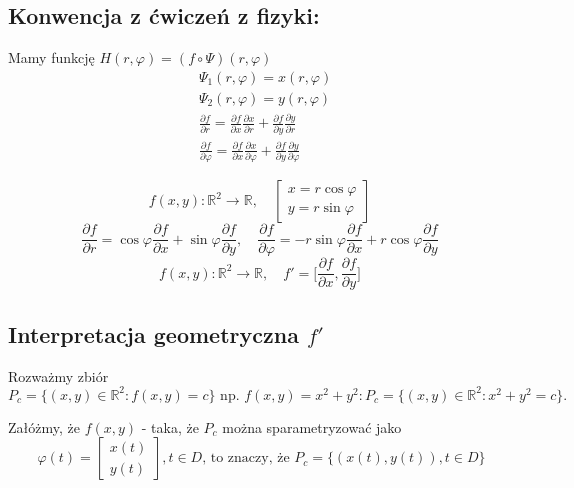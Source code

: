 \documentclass[../main.tex]{subfiles}
\begin{document}
\subsection{Konwencja z ćwiczeń z fizyki:}
\begin{przyklad}
Mamy funkcję $H(r,\varphi) = (f \circ \Psi)(r,\varphi)$
\begin{align*}
    &\Psi_1(r,\varphi)=x(r,\varphi)\\
    &\Psi_2(r,\varphi)=y(r,\varphi)\\
    &\frac{\partial f}{\partial r} = \frac{\partial f}{\partial x} \frac{\partial x}{\partial r} + \frac{\partial f}{\partial y} \frac{\partial y}{\partial r}\\
    &\frac{\partial f}{\partial \varphi} = \frac{\partial f}{\partial x} \frac{\partial x}{\partial \varphi} + \frac{\partial f}{\partial y} \frac{\partial y}{\partial \varphi}
\end{align*}

\end{przyklad}

\begin{przyklad}

\end{przyklad}
$$f(x,y):\mathbb{R}^2 \to \mathbb{R},\quad
\left [ \begin{matrix}
x=r\cos{\varphi}\\
y=r\sin{\varphi}\end{matrix}\right ]$$
$$\frac{\partial f}{\partial r} = \cos{\varphi} \frac{\partial f}{\partial x} + \sin{\varphi} \frac{\partial f}{\partial y},\quad
\frac{\partial f}{\partial \varphi} = -r\sin{\varphi} \frac{\partial f}{\partial x} + r\cos{\varphi} \frac{\partial f}{\partial y}$$
$$f(x,y):\mathbb{R}^2 \to \mathbb{R},\quad
f'= \Big [ \frac{\partial f}{\partial x} , \frac{\partial f}{\partial y} \Big ]$$

\subsection{Interpretacja geometryczna $f'$}
\begin{przyklad}

Rozważmy zbiór
    \[
        P_c = \{(x,y)\in \mathbb{R}^2 : f(x,y) = c \} \text{ np. } f(x,y) = x^2 + y^2 : P_c = \{(x,y)\in\mathbb{R}^2 : x^2+y^2 = c \}.
    \]

Załóżmy, że $f(x,y)$ - taka, że $P_c$ można sparametryzować jako $$~ \varphi(t) = \left [ \begin{matrix}
x(t)\\
y(t)\end{matrix}\right ], t\in D\text{, to znaczy, że }P_c = \{(x(t),y(t)), t\in D\}$$
\end{przyklad}
\end{document}
